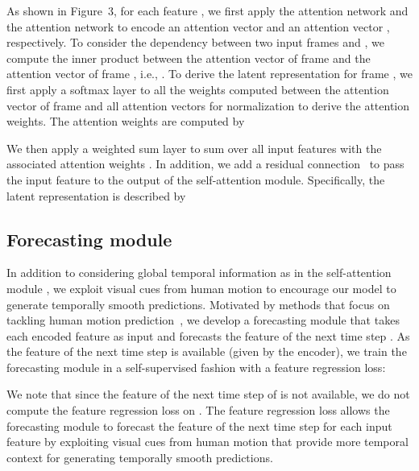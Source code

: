 \documentclass[times,referee,twocolumn,final,authoryear]{elsarticle}
\newcommand{\revised}[1]{{{#1}}}
\begin{document}
\revised{
As shown in Figure~3, for each feature , we first apply the attention network  and the attention network  to encode an attention vector  and an attention vector , respectively.
To consider the dependency between two input frames  and , we compute the inner product between the attention vector  of frame  and the attention vector  of frame , i.e., .
To derive the latent representation  for frame , we first apply a softmax layer to all the weights  computed between the attention vector  of frame  and all attention vectors  for normalization to derive the attention weights.
}
The attention weights  are computed by
\vspace{-1.5mm}

We then apply a weighted sum layer to sum over all input features  with the associated attention weights .
In addition, we add a residual connection~\citep{ResNet} to pass the input feature  to the output of the self-attention module.
Specifically, the latent representation  is described by
\vspace{-1.5mm}


\vspace{-6.0mm}
\subsection{Forecasting module}

In addition to considering global temporal information as in the self-attention module , we exploit visual cues from human motion to encourage our model to generate temporally smooth predictions.
Motivated by methods that focus on tackling human motion prediction~\citep{TemporalHMR,PHD}, we develop a forecasting module  that takes each encoded feature  as input and forecasts the feature of the next time step .
As the feature of the next time step is available (given by the encoder), we train the forecasting module  in a self-supervised fashion with a feature regression loss:
\vspace{-1.5mm}

We note that since the feature of the next time step of  is not available, we do not compute the feature regression loss on .
\revised{
The feature regression loss  allows the forecasting module  to forecast the feature of the next time step for each input feature by exploiting visual cues from human motion that provide more temporal context for generating temporally smooth predictions.
}



\vspace{-2.5mm}
\end{document}
